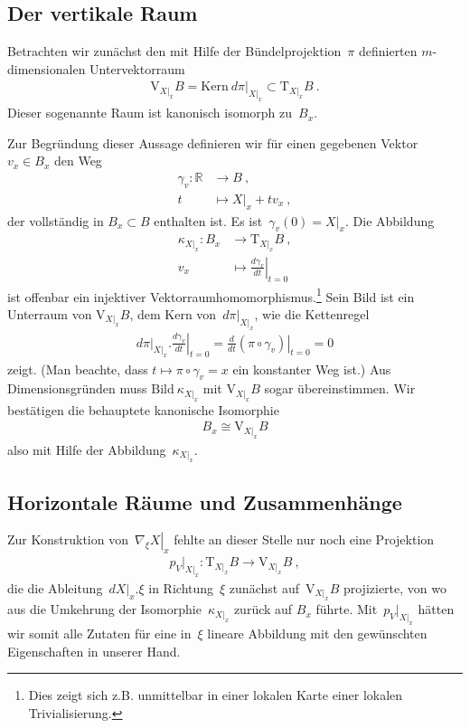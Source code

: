 \documentclass[10pt,a4paper]{article}
\newcommand{\mydef}[1]{\textls{#1}}
\begin{document}
\subsection{Der vertikale Raum}
Betrachten wir zunächst den mit Hilfe der Bündelprojektion~$\pi$ definierten $m$-dimensionalen Untervektorraum
\begin{align*}
\mathrm{V}_{X|_x}B = \mathrm{Kern}\ d\pi|_{X|_x} \subset \mathrm{T}_{X|_x} B
\ .
\end{align*}
Dieser sogenannte \mydef{vertikale} Raum ist kanonisch isomorph zu~$B_x$.

Zur Begründung dieser Aussage definieren wir für einen gegebenen Vektor~$v_x\in B_x$ den Weg
\begin{align*}
\gamma_v: \mathbb{R} &\rightarrow B
\ ,\nonumber\\
t &\mapsto X|_x + tv_x
\ ,
\end{align*}
der vollständig in $B_x\subset B$ enthalten ist.
Es ist~$\gamma_v(0) = X|_x$.
Die Abbildung
\begin{align*}
\kappa_{X|_x}: B_x&\rightarrow\mathrm{T}_{X|_x}B
\ ,\nonumber\\
v_x &\mapsto \left.\frac{d\gamma_v}{dt}\right|_{t=0}
\end{align*}
ist offenbar ein injektiver Vektorraum\-homomorphismus.\footnote{Dies zeigt sich z.B. unmittelbar in einer lokalen Karte einer lokalen Trivialisierung.}
Sein Bild ist ein Unterraum von $\mathrm{V}_{X|_x}B$, dem Kern von~$d\pi|_{X|_x}$, wie die Kettenregel
\begin{align*}
d\pi|_{X|_x} . \left.\frac{d\gamma_v}{dt}\right|_{t=0}
= 
\left.\frac{d}{dt}
\left(
\pi\circ\gamma_v
\right)
\right|_{t=0} = 0
\end{align*}
zeigt.
(Man beachte, dass $t\mapsto\pi\circ\gamma_v=x$ ein konstanter Weg ist.) 
Aus Dimensions\-gründen muss $\mathrm{Bild}\ \kappa_{X|_x}$ mit $\mathrm{V}_{X|_x}B$ sogar übereinstimmen.
Wir bestätigen die behauptete kanonische Isomorphie
\begin{align*}
B_x \cong \mathrm{V}_{X|_x}B
\end{align*}
also mit Hilfe der Abbildung~$\kappa_{X|_x}$.

\subsection{Horizontale Räume und Zusammenhänge}
\label{ssec:horizontal}

Zur Konstruktion von~$\left.\nabla_\xi X\right|_x$ fehlte an dieser Stelle nur noch eine Projektion
\begin{align*}
p_V|_{X|_x}: \mathrm{T}_{X|_x} B\rightarrow\mathrm{V}_{X|_x}B
\ ,
\end{align*}
die die Ableitung~$dX|_x.\xi$ in Richtung~$\xi$ zunächst auf~$\mathrm{V}_{X|_x}B$ projizierte, von wo aus die Umkehrung der Isomorphie~$\kappa_{X|_x}$ zurück auf $B_x$ führte.
Mit~$p_V|_{X|_x}$ hätten wir somit alle Zutaten für eine in~$\xi$ lineare Abbildung mit den gewünschten Eigenschaften in unserer Hand.
\end{document}
